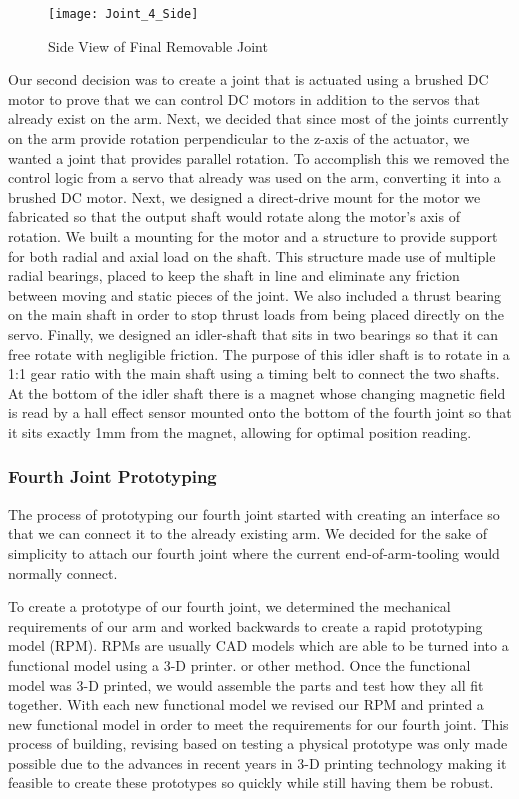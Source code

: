 \begin{figure}[H]
\centering
\texttt{[image: Joint\_4\_Side]}
\caption{Side View of Final Removable Joint}
\label{fig:Side View of Joint 4}
\end{figure}

\noindent Our second decision was to create a joint that is actuated using a brushed DC motor to prove that we can control DC motors in addition to the servos that already exist on the arm.  Next, we decided that since most of the joints currently on the arm provide rotation perpendicular to the z-axis of the actuator, we wanted a joint that provides parallel rotation.  To accomplish this we removed the control logic from a servo that already was used on the arm, converting it into a brushed DC motor.  Next, we designed a direct-drive mount for the motor we fabricated so that the output shaft would rotate along the motor's axis of rotation.  We built a mounting for the motor and a structure to provide support for both radial and axial load on the shaft.  This structure made use of multiple radial bearings, placed to keep the shaft in line and eliminate any friction between moving and static pieces of the joint.  We also included a thrust bearing on the main shaft in order to stop thrust loads from being placed directly on the servo.  Finally, we designed an idler-shaft that sits in two bearings so that it can free rotate with negligible friction. The purpose of this idler shaft is to rotate in a 1:1 gear ratio with the main shaft using a timing belt to connect the two shafts.  At the bottom of the idler shaft there is a magnet whose changing magnetic field is read by a hall effect sensor mounted onto the bottom of the fourth joint so that it sits exactly 1mm from the magnet, allowing for optimal position reading.  \\

\subsubsection{Fourth Joint Prototyping}
The process of prototyping our fourth joint started with creating an interface so that we can connect it to the already existing arm.  We decided for the sake of simplicity to attach our fourth joint where the current end-of-arm-tooling would normally connect. %

\noindent To create a prototype of our fourth joint, we determined the mechanical requirements of our arm and worked backwards to create a rapid prototyping model (RPM).  RPMs are usually CAD models which are able to be turned into a functional model using a 3-D printer. or other method.  Once the functional model was 3-D printed, we would assemble the parts and test how they all fit together.  With each new functional model we revised our RPM and printed a new functional model in order to meet the requirements for our fourth joint. This process of building, revising based on testing a physical prototype was only made possible due to the advances in recent years in 3-D printing technology making it feasible to create these prototypes so quickly while still having them be robust. 

